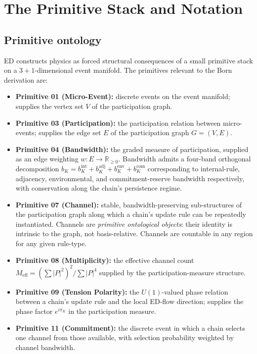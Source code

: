\documentclass[11pt,a4paper]{article}
\begin{document}
\section{The Primitive Stack and Notation}\label{sec:primitives}

\subsection{Primitive ontology}

ED constructs physics as forced structural consequences of a small primitive stack on a $3{+}1$-dimensional event manifold. The primitives relevant to the Born derivation are:

\begin{itemize}
  \item \textbf{Primitive 01 (Micro-Event):} discrete events on the event manifold; supplies the vertex set $V$ of the participation graph.
  \item \textbf{Primitive 03 (Participation):} the participation relation between micro-events; supplies the edge set $E$ of the participation graph $G = (V, E)$.
  \item \textbf{Primitive 04 (Bandwidth):} the graded measure of participation, supplied as an edge weighting $w: E \to \mathbb{R}_{\geq 0}$. Bandwidth admits a four-band orthogonal decomposition $b_K = b_K^\mathrm{int} + b_K^\mathrm{adj} + b_K^\mathrm{env} + b_K^\mathrm{com}$ corresponding to internal-rule, adjacency, environmental, and commitment-reserve bandwidth respectively, with conservation along the chain's persistence regime.
  \item \textbf{Primitive 07 (Channel):} stable, bandwidth-preserving sub-structures of the participation graph along which a chain's update rule can be repeatedly instantiated. Channels are \emph{primitive ontological objects}: their identity is intrinsic to the graph, not basis-relative. Channels are countable in any region for any given rule-type.
  \item \textbf{Primitive 08 (Multiplicity):} the effective channel count $M_\mathrm{eff} = (\sum |P|^2)^2 / \sum |P|^4$ supplied by the participation-measure structure.
  \item \textbf{Primitive 09 (Tension Polarity):} the $U(1)$-valued phase relation between a chain's update rule and the local ED-flow direction; supplies the phase factor $e^{i \pi_K}$ in the participation measure.
  \item \textbf{Primitive 11 (Commitment):} the discrete event in which a chain selects one channel from those available, with selection probability weighted by channel bandwidth.
\end{itemize}
\end{document}
